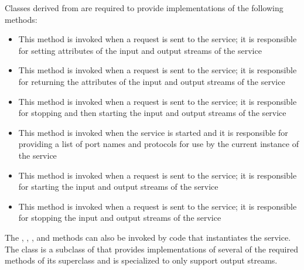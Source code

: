 Classes derived from  are required to provide
implementations of the following methods:
\begin{itemize}
\item{} This method is invoked when a
 request is sent to the service; it
is responsible for setting attributes of the input and output streams of the service
\item\exSp{} This method is invoked when a
 request is sent to the service;
it is responsible for returning the attributes of the input and output streams of the
service
\item\exSp{} This method is invoked when a
 request is sent to the
service; it is responsible for stopping and then starting the input and output streams of
the service
\item\exSp{} This method is invoked when the service is
started and it is responsible for providing a list of port names and protocols for use by
the current instance of the service
\item\exSp{} This method is invoked when a
 request is sent to the service;
it is responsible for starting the input and output streams of the service
\item\exSp{} This method is invoked when a
 request is sent to the service;
it is responsible for stopping the input and output streams of the service
\end{itemize}
The , , ,
 and  methods can also be invoked by code that
instantiates the service.
The  class is a subclass of
 that provides implementations of several of
the required methods of its superclass and is specialized to only support output
streams.\\

